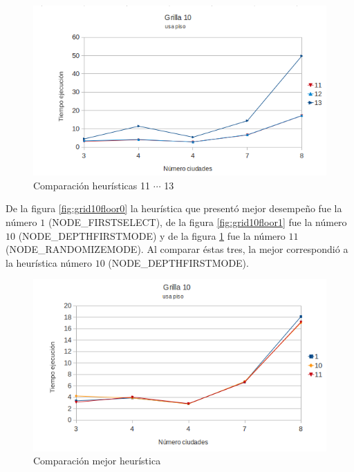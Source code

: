 \documentclass[10pt]{article}
\begin{document}
\begin{figure}[ht]
\begin{minipage}[b]{1\linewidth}
  \centering
 \includegraphics[scale=0.4]{grilla10floor2.png}
 \caption{Comparación heurísticas  11 $\cdots$ 13}
 \label{fig:grid10floor2}
\end{minipage}

\end{figure}


De la figura \ref{fig:grid10floor0} la heurística que presentó mejor desempeño fue la número $1$ (NODE\_FIRSTSELECT), de la figura \ref{fig:grid10floor1} fue la número $10$ (NODE\_DEPTHFIRSTMODE) y de la 
figura \ref{fig:grid10floor2} fue la número $11$ (NODE\_RANDOMIZEMODE). Al comparar éstas tres, la mejor correspondió a la heurística número $10$ (NODE\_DEPTHFIRSTMODE).


\begin{figure}[ht]
\begin{minipage}[b]{1\linewidth}

 \centering
 \includegraphics[scale=0.4]{grilla10floor3.png}
 \caption{Comparación mejor heurística}
 \label{fig:grid10floor3}
\end{minipage}
\end{figure}
\end{document}
